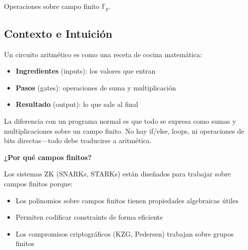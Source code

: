 \documentclass[11pt,a4paper,twoside,openright]{book}
\theoremstyle{definition}
\theoremstyle{plain}
\theoremstyle{remark}
\begin{document}
Operaciones sobre campo finito $\mathbb{F}_p$.

\subsection{Contexto e Intuición}

\begin{intuicion}
Un circuito aritmético es como una receta de cocina matemática:
\begin{itemize}
    \item \textbf{Ingredientes} (inputs): los valores que entran
    \item \textbf{Pasos} (gates): operaciones de suma y multiplicación
    \item \textbf{Resultado} (output): lo que sale al final
\end{itemize}

La diferencia con un programa normal es que todo se expresa como sumas y multiplicaciones sobre un campo finito. No hay if/else, loops, ni operaciones de bits directas---todo debe traducirse a aritmética.

\textbf{¿Por qué campos finitos?}

Los sistemas ZK (SNARKs, STARKs) están diseñados para trabajar sobre campos finitos porque:
\begin{itemize}
    \item Los polinomios sobre campos finitos tienen propiedades algebraicas útiles
    \item Permiten codificar constraints de forma eficiente
    \item Los compromisos criptográficos (KZG, Pedersen) trabajan sobre grupos finitos
\end{itemize}
\end{intuicion}
\end{document}
